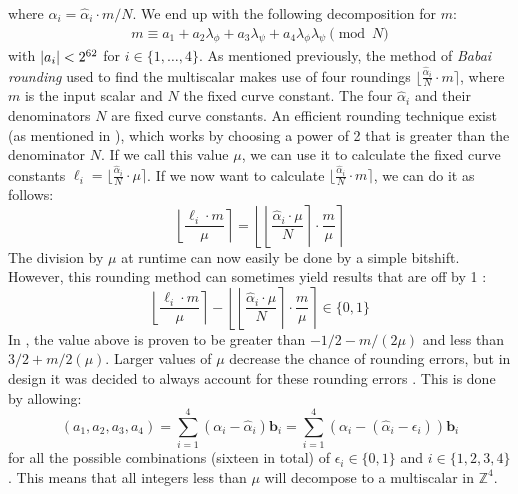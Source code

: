 %
where $\alpha_i = \hat{\alpha}_i \cdot m/N$.
We end up with the following decomposition for $m$:
%
\begin{align*}
m \equiv a_1 + a_2 \lambda_\phi + a_3 \lambda_\psi + a_4 \lambda_\phi \lambda_\psi \pmod{N}
\end{align*}
%
with $\abs{a_i} < 2^{62}$ for $i \in \{1,\ldots,4\}$.
As mentioned previously, the method of \emph{Babai rounding} used to find the multiscalar makes use of four roundings $\lfloor \frac{\hat{\alpha}_i}{N} \cdot m \rceil$, where $m$ is the input scalar and $N$ the fixed curve constant.
The four $\hat{\alpha}_i$ and their denominators $N$ are fixed curve constants.
An efficient rounding technique exist (as mentioned in \cite{costello2015fourq}), which works by choosing a power of 2 that is greater than the denominator $N$.
If we call this value $\mu$, we can use it to calculate the fixed curve constants $\ell_i = \lfloor \frac{\hat{\alpha}_i}{N} \cdot \mu \rceil$.
If we now want to calculate $\lfloor \frac{\hat{\alpha}_i}{N} \cdot m \rceil$, we can do it as follows:
%
\begin{equation*}
\left\lfloor \frac{\ell_i \cdot m}{\mu} \right\rceil = \left\lfloor \left\lfloor \frac{\hat{\alpha}_i \cdot \mu}{N} \right\rceil \cdot \frac{m}{\mu} \right\rceil
\end{equation*}
%
The division by $\mu$ at runtime can now easily be done by a simple bitshift.
However, this rounding method can sometimes yield results that are off by 1 \cite[§4.2 Lemma 1]{costello2015fourq}:
%
\begin{equation*}
\left\lfloor \frac{\ell_i \cdot m}{\mu} \right\rceil - \left\lfloor \left\lfloor \frac{\hat{\alpha}_i \cdot \mu}{N} \right\rceil \cdot \frac{m}{\mu} \right\rceil \in \{0, 1\}
\end{equation*}
%
In \cite[§4.2 Lemma 1]{costello2015fourq}, the value above is proven to be greater than $-1/2 - m/(2\mu)$ and less than $3/2 + m/2(\mu)$.
Larger values of $\mu$ decrease the chance of rounding errors, but in {\fourqs} design it was decided to always account for these rounding errors \cite{costello2015fourq}.
This is done by allowing:
%
\begin{equation*}
(a_1, a_2, a_3, a_4) = \sum_{i=1}^{4}(\alpha_i - \hat{\alpha}_i) \bm{b}_i = \sum_{i=1}^{4}(\alpha_i - (\hat{\alpha}_i - \epsilon_i)) \bm{b}_i
\end{equation*}
%
for all the possible combinations (sixteen in total) of $\epsilon_i \in \{0, 1\}$ and $i \in \{1, 2, 3, 4\}$.
This means that all integers less than $\mu$ will decompose to a multiscalar in $\mathbb{Z}^4$.
